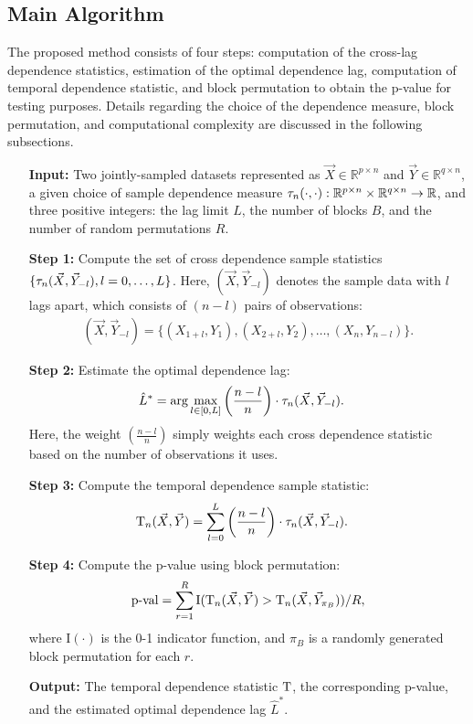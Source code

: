 \subsection{Main Algorithm}
The proposed method consists of four steps: computation of the cross-lag dependence statistics, estimation of the optimal dependence lag, computation of temporal dependence statistic, and block permutation to obtain the p-value for testing purposes. Details regarding the choice of the dependence measure, block permutation, and computational complexity are discussed in the following subsections.

\begin{itemize}
\item[\textbf{Input:}] Two jointly-sampled datasets represented as $\vec{X} \in \mathbb{R}^{p \times n}$ and $\vec{Y} \in \mathbb{R}^{q \times n}$, a given choice of sample dependence measure $\tau_{n}(\cdot,\cdot): \mathbb{R}^{p \times n} \times \mathbb{R}^{q \times n} \rightarrow \mathbb{R}$, and three positive integers: the lag limit $L$, the number of blocks $B$, and the number of random permutations $R$.
\item[\textbf{Step 1:}] Compute the set of cross dependence sample statistics $\{\tau_{n}(\vec{X}, \vec{Y}_{-l}), l=0,\ldots,L\}$. Here, $(\vec{X}, \vec{Y}_{-l})$ denotes the sample data with $l$ lags apart, which consists of $(n-l)$ pairs of observations:
\begin{align*}
    (\vec{X}, \vec{Y}_{-l}) = \{(X_{1+l},Y_{1}),(X_{2+l},Y_{2}),\ldots,(X_{n},Y_{n-l})\}.
\end{align*}
\item[\textbf{Step 2:}] Estimate the optimal dependence lag:
\begin{align*}
    \hat{L}^{*} &= \arg\max_{l \in [0,L]} \left(\frac{n-l}{n}\right) \cdot \tau_{n}(\vec{X}, \vec{Y}_{-l}).
\end{align*}
Here, the weight $\left(\frac{n-l}{n}\right)$ simply weights each cross dependence statistic based on the number of observations it uses.
\item[\textbf{Step 3:}] Compute the temporal dependence sample statistic:
\begin{align*}
    \mathrm{T}_{n}(\vec{X}, \vec{Y}) &= \sum_{l=0}^{L} \left(\frac{n-l}{n}\right) \cdot \tau_{n}(\vec{X}, \vec{Y}_{-l}).
\end{align*}
\item[\textbf{Step 4:}] Compute the p-value using block permutation:
    \begin{align*}
    \mbox{p-val} = \sum_{r=1}^{R}\mbox{I}(\mathrm{T}_{n}(\vec{X}, \vec{Y}) > \mathrm{T}_{n}(\vec{X}, \vec{Y}_{\pi_{B}})) / R,
    \end{align*} 
    where $\mbox{I}(\cdot)$ is the 0-1 indicator function, and $\pi_{B}$ is a randomly generated block permutation for each $r$.
\item[\textbf{Output:}] The temporal dependence statistic $\mathrm{T}$, the corresponding p-value, and the estimated optimal dependence lag $\hat{L}^{*}$.
\end{itemize}

